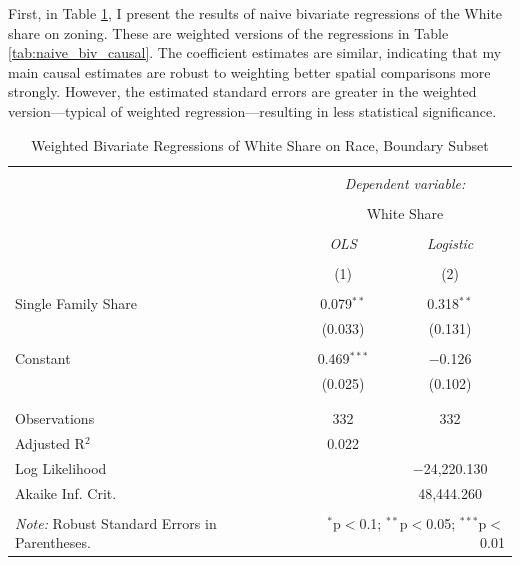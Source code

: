 \documentclass[11pt]{article}
\begin{document}
First, in Table \ref{tab:naive_biv_weighted}, I present the results of naive bivariate regressions of the White share on zoning. These are weighted versions of the regressions in Table \ref{tab:naive_biv_causal}. The coefficient estimates are similar, indicating that my main causal estimates are robust to weighting better spatial comparisons more strongly. However, the estimated standard errors are greater in the weighted version---typical of weighted regression---resulting in less statistical significance.

\begin{table}[!htbp] \centering 
  \caption{Weighted Bivariate Regressions of White Share on Race, Boundary Subset} 
  \label{tab:naive_biv_weighted} 
\begin{tabular}{@{\extracolsep{5pt}}lcc} 
\\[-1.8ex]\hline 
\hline \\[-1.8ex] 
 & \multicolumn{2}{c}{\textit{Dependent variable:}} \\ 
\cline{2-3} 
\\[-1.8ex] & \multicolumn{2}{c}{White Share} \\ 
\\[-1.8ex] & \textit{OLS} & \textit{Logistic} \\ 
\\[-1.8ex] & (1) & (2)\\ 
\hline \\[-1.8ex] 
 Single Family Share & 0.079$^{**}$ & 0.318$^{**}$ \\ 
  & (0.033) & (0.131) \\ 
  & & \\ 
 Constant & 0.469$^{***}$ & $-$0.126 \\ 
  & (0.025) & (0.102) \\ 
  & & \\ 
\hline \\[-1.8ex] 
Observations & 332 & 332 \\ 
Adjusted R$^{2}$ & 0.022 &  \\ 
Log Likelihood &  & $-$24,220.130 \\ 
Akaike Inf. Crit. &  & 48,444.260 \\ 
\hline 
\hline \\[-1.8ex] 
\textit{Note:} Robust Standard Errors in Parentheses.  & \multicolumn{2}{r}{$^{*}$p$<$0.1; $^{**}$p$<$0.05; $^{***}$p$<$0.01}\\ 
\end{tabular} 
\end{table} 
\end{document}
